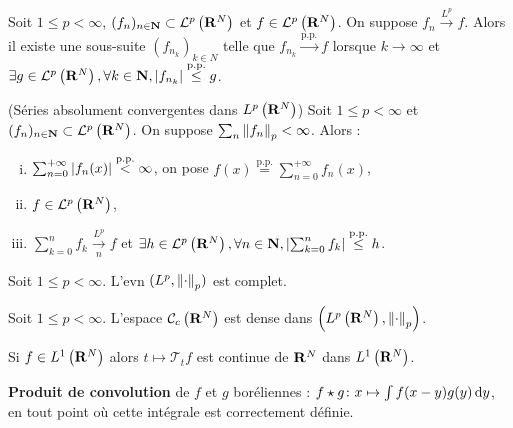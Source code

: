 \begin{thm}
	Soit $1 \leq p < \infty$, $(f_n)_{n \in \mathbf{N}} \subset \mathcal{L}^p \left( \mathbf{R}^N \right)$ et $f \in \mathcal{L}^p \left( \mathbf{R}^N \right)$.
	On suppose $f_n \overset{L^p}{\to} f$.
	Alors il existe une sous-suite $(f_{n_k})_{k \in N}$ telle que $f_{n_k} \overset{\text{p.p.}}{\to} f$ lorsque $k \to \infty$ et $\exists g \in \mathcal{L}^p \left( \mathbf{R}^N \right), \forall k \in \mathbf{N}, \left\lvert f_{n_k}\right\rvert \overset{\text{p.p.}}{\leq} g$.
\end{thm}

\begin{pop}(Séries absolument convergentes dans $L^p \left( \mathbf{R}^N \right)$)
	Soit $1 \leq p < \infty$ et $(f_n)_{n \in \mathbf{N}} \subset \mathcal{L}^p \left( \mathbf{R}^N \right)$.
	On suppose $\sum_n \left\lVert f_n\right\rVert_p < \infty$.
	Alors :
	\begin{enumerate}[(i)]
		\item $\sum_{n = 0}^{+\infty} \left\lvert f_n(x)\right\rvert \overset{\text{p.p.}}{<} \infty$, on pose $f(x) \overset{\text{p.p.}}{=} \sum_{n = 0}^{+\infty} f_n(x)$,
		\item $f \in \mathcal{L}^p \left( \mathbf{R}^N \right)$,
		\item $\sum_{k = 0}^{n} f_k \overset{L^p}{\underset{n}{\to}} f$ et $\exists h \in \mathcal{L}^p \left( \mathbf{R}^N \right), \forall n \in \mathbf{N}, \left\lvert\sum_{k = 0}^{n} f_k\right\rvert \overset{\text{p.p.}}{\leq} h$.
	\end{enumerate}
\end{pop}

\begin{thm}
	Soit $1 \leq p < \infty$.
	L'evn $(L^p,\left\lVert\cdot\right\rVert_p)$ est complet.
\end{thm}

\begin{thm}
	Soit $1 \leq p < \infty$.
	L'espace $\mathcal{C}_c \left( \mathbf{R}^N \right)$ est dense dans $\left(L^p \left( \mathbf{R}^N \right) ,\left\lVert\cdot\right\rVert_p \right)$.
\end{thm}

\begin{thm}
	Si $f \in L^1 \left( \mathbf{R}^N \right)$ alors $t \mapsto \mathcal{T}_t f$ est continue de $\mathbf{R}^N$ dans $L^1 \left( \mathbf{R}^N \right)$.
\end{thm}

\begin{defn}
	\textbf{Produit de convolution} de $f$ et $g$ boréliennes : $f \star g \colon x \mapsto \int f(x - y)g(y) \mathop{}\mathopen{}\mathrm{d} y$, en tout point où cette intégrale est correctement définie.
\end{defn}

